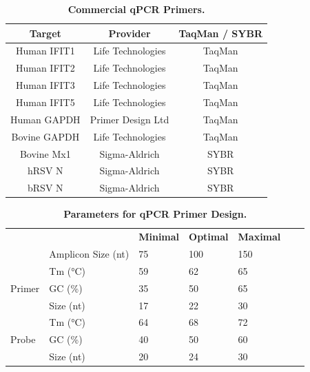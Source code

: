 \begin{table}
\centering
\begin{tabular}{ccc}
\textbf{Target} & \textbf{Provider} & \textbf{TaqMan / SYBR} \\ \hline
Human IFIT1     & Life Technologies & TaqMan                 \\ \hline
Human IFIT2     & Life Technologies & TaqMan                 \\ \hline
Human IFIT3     & Life Technologies & TaqMan                 \\ \hline
Human IFIT5     & Life Technologies & TaqMan                 \\ \hline
Human GAPDH     & Primer Design Ltd & TaqMan                 \\ \hline
Bovine GAPDH    & Life Technologies & TaqMan                 \\ \hline
Bovine Mx1      & Sigma-Aldrich     & SYBR                   \\ \hline
hRSV N          & Sigma-Aldrich     & SYBR                   \\ \hline
bRSV N          & Sigma-Aldrich     & SYBR                   \\ \hline
\end{tabular}
\caption[Commercial qPCR Primers.]{\textbf{Commercial qPCR Primers.}}
\label{tab:Commercial qPCR Primers Table}
\end{table}


\begin{table}
\centering
\begin{tabular}{lllllll}
                        &                    & \textbf{Minimal} & \textbf{Optimal} & \textbf{Maximal} &  &  \\ \cline{3-5}
                        & Amplicon Size (nt) & 75               & 100              & 150              &  &  \\ \cline{1-5}
\multirow{3}{*}{Primer} & Tm (°C)            & 59               & 62               & 65               &  &  \\ \cline{2-5}
                        & GC (\%)            & 35               & 50               & 65               &  &  \\ \cline{2-5}
                        & Size (nt)          & 17               & 22               & 30               &  &  \\ \cline{1-5}
\multirow{3}{*}{Probe}  & Tm (°C)            & 64               & 68               & 72               &  &  \\ \cline{2-5}
                        & GC (\%)            & 40               & 50               & 60               &  &  \\ \cline{2-5}
                        & Size (nt)          & 20               & 24               & 30               &  &  \\ \cline{1-5}
\end{tabular}
\caption[Parameters for qPCR Primer Design.]{\textbf{Parameters for qPCR Primer Design.}}
\label{tab:Parameters for qPCR Primer Design table}
\end{table}


